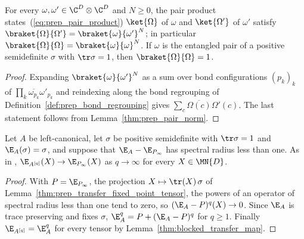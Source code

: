 \begin{lemma}
    \label{thm:prep_pair_product_norm}
    \leanok
    For every $\omega,\omega'\in\C^D\otimes\C^D$ and $N\ge0$, the pair product
    states~(\ref{eq:prep_pair_product}) $\ket{\Omega}$ of $\omega$ and
    $\ket{\Omega'}$ of $\omega'$ satisfy
    $\braket{\Omega}{\Omega'}=\braket{\omega}{\omega'}^N$; in particular
    $\braket{\Omega}{\Omega}=\braket{\omega}{\omega}^N$. If $\omega$ is the
    entangled pair of a positive semidefinite $\sigma$ with $\tr\sigma=1$,
    then $\braket{\Omega}{\Omega}=1$.
\end{lemma}
\begin{proof}
    \leanok
    Expanding $\braket{\omega}{\omega'}^N$ as a sum over bond configurations
    $(p_k)_k$ of $\prod_k\overline{\omega_{p_k}}\omega'_{p_k}$ and
    reindexing along the bond regrouping of
    Definition~\ref{def:prep_bond_regrouping} gives
    $\sum_c\overline{\Omega(c)}\Omega'(c)$. The last statement follows
    from Lemma~\ref{thm:prep_pair_norm}.
\end{proof}

\begin{lemma}
    \label{thm:prep_blocked_transfer_limit_gap}
    \leanok
    Let $A$ be left-canonical, let $\sigma$ be positive semidefinite with
    $\tr\sigma=1$ and $\E_A(\sigma)=\sigma$, and suppose that
    $\E_A-\E_{P_\infty}$ has spectral radius less than one. As in
    \cite{Malz2024Preparation},
    $\E_{A^{[q]}}(X)\to\E_{P_\infty}(X)$ as $q\to\infty$ for every
    $X\in\MN{D}$.
\end{lemma}
\begin{proof}
    \leanok
    With $P=\E_{P_\infty}$, the projection $X\mapsto\tr(X)\,\sigma$ of
    Lemma~\ref{thm:prep_transfer_fixed_point_tensor}, the powers of an
    operator of spectral radius less than one tend to zero, so
    $(\E_A-P)^q(X)\to0$. Since $\E_A$ is trace preserving and fixes
    $\sigma$, $\E_A^q=P+(\E_A-P)^q$ for $q\ge1$. Finally
    $\E_{A^{[q]}}=\E_A^q$ for every tensor by
    Lemma~\ref{thm:blocked_transfer_map}.
\end{proof}

